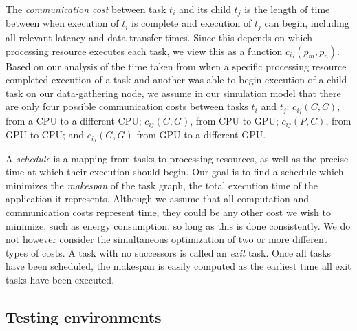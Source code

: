 \documentclass[runningheads]{llncs}
\begin{document}
The {\em communication cost} between task $t_i$ and its child $t_j$ is the length of time between when execution of $t_i$ is complete and execution of $t_j$ can begin, including all relevant latency and data transfer times. Since this depends on which processing resource executes each task, we view this as a function $c_{ij}(p_m, p_n)$. Based on our analysis of the time taken from when a specific processing resource completed execution of a task and another was able to begin execution of a child task on our data-gathering node, we assume in our simulation model that there are only four possible communication costs between tasks $t_i$ and $t_j$: $c_{ij}(C, C)$, from a CPU to a different CPU; $c_{ij}(C, G)$, from CPU to GPU; $c_{ij}(P, C)$, from GPU to CPU; and $c_{ij}(G, G)$ from GPU to a different GPU. 

A {\em schedule} is a mapping from tasks to processing resources, as well as the precise time at which their execution should begin. Our goal is to find a schedule which minimizes the {\em makespan} of the task graph, the total execution time of the application it represents. Although we assume that all computation and communication costs represent time, they could be any other cost we wish to minimize, such as energy consumption, so long as this is done consistently. We do not however consider the simultaneous optimization of two or more different types of costs. A task with no successors is called an {\em exit} task. Once all tasks have been scheduled, the makespan is easily computed as the earliest time all exit tasks have been executed.

\subsection{Testing environments}
\label{subsect.testing_environment}
\end{document}
